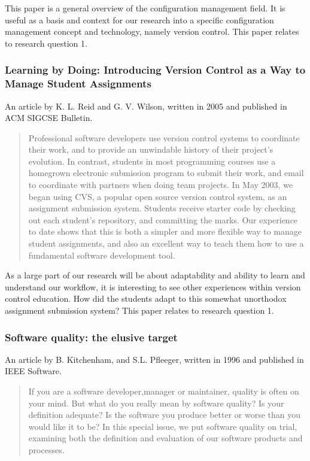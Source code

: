 \documentclass{article}
\begin{document}
This paper is a general overview of the configuration management
field. It is useful as a basis and context for our research into a
specific configuration management concept and technology, namely
version control. This paper relates to research question 1.

\subsubsection{Learning by Doing: Introducing Version Control as a Way to
               Manage Student Assignments}

An article by K. L. Reid and G. V. Wilson, written in 2005 and published in
ACM SIGCSE Bulletin\cite{reid05}.

\begin{abstract}
 Professional software developers use version control systems to coordinate
 their work, and to provide an unwindable history of their project's
 evolution. In contrast, students in most programming courses use a
 homegrown electronic submission program to submit their work, and email to
 coordinate with partners when doing team projects. In May 2003, we began
 using CVS, a popular open source version control system, as an assignment
 submission system. Students receive starter code by checking out each
 student's repository, and committing the marks. Our experience to date
 shows that this is both a simpler and more flexible way to manage student
 assignments, and also an excellent way to teach them how to use a
 fundamental software development tool.
\end{abstract}

As a large part of our research will be about adaptability and ability
to learn and understand our workflow, it is interesting to see other
experiences within version control education. How did the students
adapt to this somewhat unorthodox assignment submission system? This
paper relates to research question 1.

\subsubsection{Software quality: the elusive target}

An article by B. Kitchenham, and S.L. Pfleeger, written in 1996 and
published in IEEE Software\cite{kitchenam96}.

\begin{abstract}
 If you are a software developer,manager or maintainer, quality is
 often on your mind. But what do you really mean by software quality?
 Is your definition adequate? Is the software you produce better or
 worse than you would like it to be? In this special issue, we put
 software quality on trial, examining both the definition and
 evaluation of our software products and processes.
\end{abstract}
\end{document}
